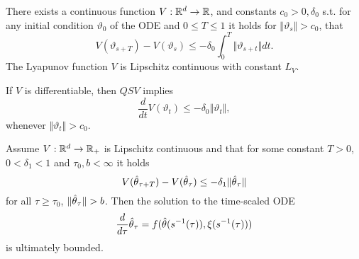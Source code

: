 
There exists a continuous function \(V:\mathbb{R}^d\to\mathbb{R}\), and constants
\(c_0>0,\delta_0\) s.t. for any initial condition \(\vartheta_0\) of the ODE 
and \(0\leq T\leq 1\) it holds for \(\Vert \vartheta_s\Vert>c_0\), that 
\[V(\vartheta_{s+T})-V(\vartheta_s)\leq -\delta_0\int_0^T\Vert  \vartheta_{s+t}\Vert dt.\]
The Lyapunov function \(V\) is Lipschitz continuous with constant \(L_V\).  


If \(V\) is differentiable, then \(QSV\) implies 
\[\frac{d}{dt}V(\vartheta_t)\leq -\delta_0\Vert \vartheta_t\Vert,\]
whenever \(\Vert \vartheta_t\Vert >c_0\).
\begin{lemma}\label{lem:43}
    Assume \(V:\mathbb{R}^d\to\mathbb{R}_+\) is Lipschitz continuous and that for some constant \(T>0\),
    \(0<\delta_1<1\) and \(\tau_0,b<\infty\) it holds 
    \[V({\hat{\theta}}_{\tau+T})-V({\hat{\theta}}_\tau)\leq -\delta_1\Vert {\hat{\theta}}_\tau\Vert\]
    for all \(\tau\geq \tau_0\), \(\Vert{\hat{\theta}}_\tau\Vert>b\). Then the solution 
    to the time-scaled ODE 
    \begin{align*}\label{eq:ts-ode}
        \frac{d}{d\tau} {\hat{\theta}}_\tau = f({\hat{\theta}}(s^{-1}(\tau)),\xi(s^{-1}(\tau)))
    \end{align*}
    is ultimately bounded. 
\end{lemma}


